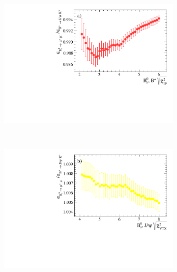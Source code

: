 \begin{figure}[htbp]
    \centering
    \begin{subfigure}[b]{0.45\textwidth}
        \includegraphics[width=\textwidth]{./Figs/Selection/BsMuMu_JPsiK_IP.pdf}
        \caption{}
        \label{fig:IPS_ratio}
    \end{subfigure}
    ~ %
    \begin{subfigure}[b]{0.45\textwidth}
        \includegraphics[width=\textwidth]{./Figs/Selection/BsMuMu_JpsiK_vertex.pdf}
        \caption{}
        \label{fig:CHI2_ratio}
    \end{subfigure}
    ~ %


\end{figure}

